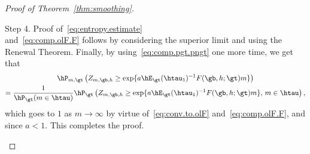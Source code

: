 \begin{proof}[Proof of Theorem~\ref{thm:smoothing}]
\begin{laststep}{Step 4. Proof of~\eqref{eq:entropy.estimate}}
\begin{equation}
\end{equation}
and~\eqref{eq:comp.olF.F} follows by considering the superior limit and using the Renewal Theorem. Finally, by using~\eqref{eq:comp.pgt.pngt} one more time, we get that
\begin{multline}
\hP_{m,\gt} \left(Z_{m,\gb,h}\geq \exp\{a \hE_\gt(\htau_1)^{-1} F(\gb,h;\gt) m\} \right)\\
= \frac{1}{\hP_\gt(m \in \htau)} \hP_{\gt} \left(Z_{m,\gb,h} \geq \exp\{a \hE_\gt(\htau_1)^{-1} F(\gb,h;\gt) m\}, \, m \in \htau \right),
\end{multline}
which goes to $1$ as $m \to \infty$ by virtue of~\eqref{eq:conv.to.olF} and~\eqref{eq:comp.olF.F}, and since $a<1$. This completes the proof.
\end{laststep}
\let\qed\relax
\end{proof}

